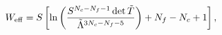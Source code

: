 \begin{equation}\label{Eq:WeffMass2}
W_{\rm eff}=S 
\left[ 
\ln
\left(
\frac{
S^{N_c-N_f-1}\det {\tilde T}
}
{
	{\tilde \Lambda}^{3N_c-N_f-5}
}
\right)
+N_f-N_c+1
\right]
,
\end{equation}


